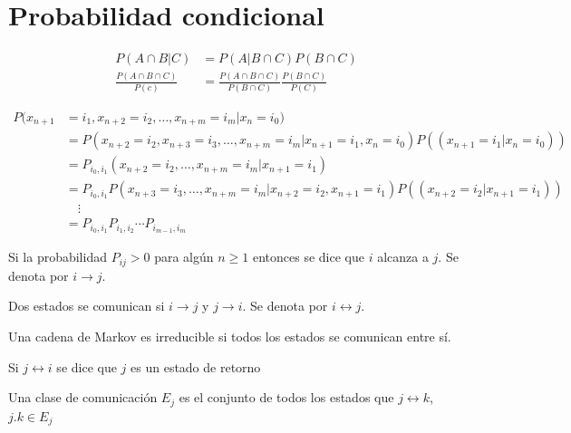 \section{Probabilidad condicional}

\begin{align*}
    P(A \cap B|C) & = P(A|B \cap C) P(B \cap C) \\
    \frac{P(A \cap B \cap C)}{P(c)} &= \frac{P(A \cap B \cap C)}{P(B \cap C)} \frac{P(B \cap C)}{P(C)}
\end{align*}

\begin{align*}
    P(x_{n+1} & =i_{1}, x_{n+2}= i_{2}, \dots, x_{n+m}= i_{m}|x_{n}=i_{0}) \\
    & = P(x_{n+2} = i_{2}, x_{n+3} = i_{3}, \dots, x_{n+m}= i_{m}|x_{n+1}= i_{1}, x_{n}=i_{0}) P((x_{n+1}= i_{1}| x_{n}=i_{0}))\\
    & = P_{i_{0}, i_{1}}(x_{n+2} = i_{2}, \dots, x_{n+m}= i_{m}|x_{n+1}= i_{1}) \\
    & = P_{i_{0}, i_{1}}P(x_{n+3} = i_{3}, \dots, x_{n+m}= i_{m}|x_{n+2}= i_{2}, x_{n+1}= i_{1}) P((x_{n+2}= i_{2}| x_{n+1}= i_{1}))\\
    & \quad \vdots \\
    & = P_{i_{0}, i_{1}} P_{i_{1}, i_{2}} \cdots P_{i_{m-1}, i_{m}}
\end{align*}


\begin{defi}{}{}
Si la probabilidad $P_{ij} > 0$ para algún $n \geq 1$ entonces se dice que $i$ alcanza a $j$. Se denota por $i \to j$.
\end{defi}

\begin{defi}{}{}
    Dos estados se comunican si $i \to j$ y $j \to i$. Se denota por $i \leftrightarrow j$.
\end{defi}

\begin{defi}{}{}
    Una cadena de Markov es irreducible si todos los estados se comunican entre sí.
\end{defi}

\begin{defi}{}{}
    Si $j \leftrightarrow i$ se dice que $j$ es un estado de retorno   
\end{defi}

\begin{defi}{}{}
    Una clase de comunicación $E_{j}$ es el conjunto de todos los estados que $j \leftrightarrow k$, $j .k \in E_{j}$
\end{defi}

